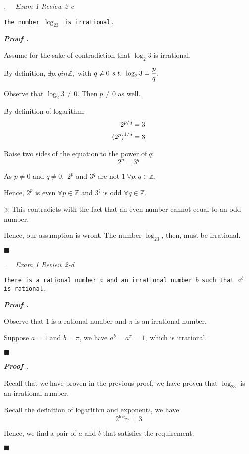 \documentclass[10pt,letter]{article}
\newcounter{nq}[section]
\newcounter{np}[section]
\newenvironment*{p}{\par\noindent\textbf{\textit{Proof \stepcounter{np}\thenp. }}\par}{\par\hfill $\blacksquare$\par}
\newenvironment*{q}[1]{\noindent\emph{\thesection.\stepcounter{nq}\thenq$\quad $ #1}\par\noindent\texttt}{}
\def\Z{{\mathbb{Z}}}
\def\st{\emph{ s.t. }}
\begin{document}
\begin{framed}\begin{q}
	{Exam 1 Review 2-c}
	{The number $\log_23$ is irrational.}
\end{q}\end{framed}
\begin{p}
	Assume for the sake of contradiction that $\log_2{3}$ is irrational.\par By definition, $\exists p,qin\Z,$ with $q\neq0\st\log_2{3}=\dfrac{p}{q}.$\par Observe that $\log_2{3}\neq0$. Then $p\neq0$ as well.\par By definition of logarithm, \[\begin{aligned}2^{p/q}&=3\\\qty(2^p)^{1/q}&=3\end{aligned}\]\par Raise two sides of the equation to the power of $q$: \[2^p=3^q\]\par As $p\neq0$ and $q\neq0,$ $2^p$ and $3^q$ are not $1\ \forall p,q\in\Z.$\par Hence, $2^p$ is even $\forall p\in\Z$ and $3^q$ is odd $\forall q\in\Z.$\par\begin{center}$\divideontimes$ This contradicts with the fact that an even number cannot equal to an odd number. \end{center}\par Hence, our assumption is wront. The number $\log_23$, then, must be irrational.
\end{p}

\begin{framed}\begin{q}
	{Exam 1 Review 2-d}
	{There is a rational number $a$ and an irrational number $b$ such that $a^b$ is rational.}
\end{q}\end{framed}
\begin{p}
	Observe that $1$ is a rational number and $\pi$ is an irrational number. \par Suppose $a=1$ and $b=\pi$, we have $a^b=a^\pi=1,$ which is irrational.	
\end{p}
\begin{p}
	Recall that we have proven in the previous proof, we have proven that $\log_23$ is an irrational number.\par Recall the definition of logarithm and exponents, we have \[2^{\log_23}=3\]\par Hence, we find a pair of $a$ and $b$ that  satisfies the requirement. 
\end{p}
\end{document}
